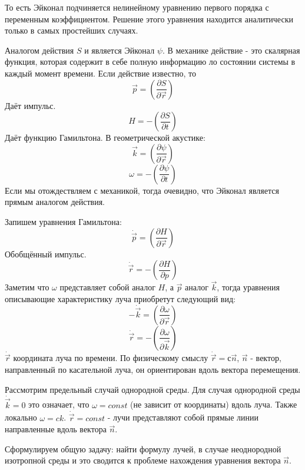 \documentclass[14pt,a4paper,oneside]{extarticle}	%
\newcommand{\bracket}[1] {\left( #1 \right) } %
\newcommand{\dif}[2] {\bracket{ \frac{\partial #1}{\partial #2} }}
\begin{document}
То есть Эйконал подчиняется нелинейному уравнению первого порядка с переменным коэффициентом.
Решение этого уравнения находится аналитически только в самых простейших случаях.

Аналогом действия  $ S $ и является Эйконал $ \psi $.
В механике действие - это скалярная функция, которая содержит в себе полную информацию ло состоянии системы в каждый момент времени. Если действие известно, то 
\begin{equation*}
\vec{p} = \dif{S}{\vec{r}}
\end{equation*}
Даёт импульс. 
\begin{equation*}
H = -\dif{S}{t}
\end{equation*}
Даёт функцию Гамильтона.
В геометрической акустике:
\begin{equation*}
\vec{k} = \dif{\psi}{\vec{r}}
\end{equation*}
\begin{equation*}
\omega = -\dif{\psi}{t}
\end{equation*}
Если мы отождествляем с механикой, тогда очевидно, что Эйконал является прямым аналогом действия.

Запишем уравнения Гамильтона:
\begin{equation*}
\dot{\vec{p}} = \dif{H}{\vec{r}}
\end{equation*}
Обобщённый импульс.
\begin{equation*}
\dot{\vec{r}} = -\dif{H}{p}
\end{equation*}
Заметим что $ \omega $ представляет собой аналог $ H $, а $ \vec{p} $ аналог $ \vec{k} $, тогда уравнения описывающие характеристику луча приобретут следующий вид:
\begin{equation*}
-\dot{\vec{k}} = \dif{\omega}{\vec{r}}
\end{equation*}
\begin{equation*}
\dot{\vec{r}} = -\dif{\omega}{\vec{k}}
\end{equation*}
$ \dot{\vec{r}} $ координата луча по времени. По физическому смыслу $ \dot{\vec{r}} = с\vec{n} $, $ \vec{n} $ - вектор, направленный по касательной луча, он ориентирован вдоль вектора перемещения.


Рассмотрим предельный случай однородной среды.
Для случая однородной среды $ \dot{\vec{k}}  = 0 $ это означает, что $ \omega = const $ (не зависит от координаты) вдоль луча. Также локально $ \omega = ck $. $ \dot{\vec{r}} = const $ - лучи представляют собой прямые линии направленные вдоль вектора $ \vec{n} $.

Сформулируем общую задачу: найти формулу лучей, в случае неоднородной изотропной среды и это сводится к проблеме нахождения уравнения вектора $ \vec{n} $.
 
\end{document}
